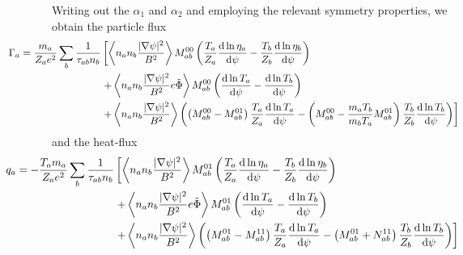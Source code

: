 \documentclass[12pt, a4paper]{article}
\renewcommand{\d}{\ensuremath{\mathrm{d}}}
\newcommand{\lang}{\left\langle}
\newcommand{\rang}{\right\rangle}
\begin{document}
Writing out the $\alpha_1$ and $\alpha_2$ and employing the relevant symmetry properties, we obtain the particle flux
\begin{equation}
\begin{aligned}
 \hspace*{-10ex} \Gamma_a =  \frac{m_a}{Z_a e^2}\sum_b \frac{1}{\tau_{ab} n_b}&\left[\lang  n_a n_b\frac{ |\nabla \psi|^2}{B^2} \rang M_{ab}^{00} \left(\frac{ T_a}{Z_a}  \frac{\d \ln\eta_a}{\d \psi} -\frac{ T_b}{Z_b}  \frac{\d \ln\eta_b}{\d \psi}\right) \right.\\
    &\left.+    \lang n_a n_b\frac{  |\nabla \psi|^2}{B^2} e\tilde{\Phi} \rang M_{ab}^{00} \left(\frac{\d \ln T_a}{\d \psi} -\frac{\d \ln T_b}{\d \psi}\right) \right.\\
   &\left. + \lang n_a n_b \frac{|\nabla \psi|^2 }{B^2}\rang\left(  \left(M_{ab}^{00} - M_{ab}^{01}\right)\frac{ T_a}{Z_a}\frac{\d \ln T_a}{\d \psi} 
    - \left(M_{ab}^{00} - \frac{m_a T_b}{m_b T_a} M_{ab}^{01}\right)\frac{ T_b}{Z_b}\frac{\d \ln T_b}{\d \psi}\right)\right] 
\end{aligned}
\end{equation}
and the heat-flux
\begin{equation}
\begin{aligned}
  \hspace*{-10ex} q_a =  -\frac{T_a m_a}{Z_a e^2} \sum_b \frac{1}{\tau_{ab} n_b} &\left[
    \lang n_a n_b\frac{|\nabla \psi|^2}{B^2 } \rang M_{ab}^{01}\left(\frac{T_a}{Z_a}  \frac{\d \ln\eta_a}{\d \psi} - \frac{T_b}{Z_b}\frac{\d \ln\eta_b}{\d \psi}\right) \right.\\
    &\left.+\lang n_a n_b\frac{|\nabla \psi|^2}{B^2 } e \tilde{\Phi} \rang M_{ab}^{01} \left(\frac{\d \ln T_a}{\d \psi}-\frac{\d \ln T_b}{\d \psi}\right) \right.\\
    &\left.+ \lang n_a n_b\frac{|\nabla \psi|^2}{B^2 } \rang \left(\left(M_{ab}^{01} - M_{ab}^{11}\right)\frac{ T_a}{Z_a} \frac{\d \ln T_a}{\d \psi}
    - \left(M_{ab}^{01} + N_{ab}^{11}\right)\frac{T_b}{Z_b}\frac{\d \ln T_b}{\d \psi}\right) \right]
\end{aligned}
\end{equation}
\end{document}
